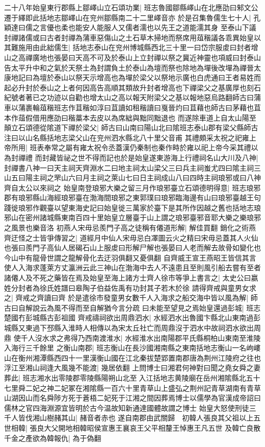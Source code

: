 二十八年始皇東行郡縣上鄒嶧山立石頌功業|{
	班志魯國鄒縣嶧山在北應劭曰邾文公遷于繹即此括地志鄒嶧山在兖州鄒縣南二十二里嶧音亦}
於是召集魯儒生七十人|{
	孔穎達曰儒之言優也柔也能安人能服人又儒者濡也以先王之道能濡其身}
至泰山下議封禪諸儒或曰古者封禪為蒲車惡傷山之土石草木掃地而祭席用葅稭議各乖異始皇以其難施用由此絀儒生|{
	括地志泰山在兖州博城縣西北三十里一曰岱宗服䖍曰封者增山之高禪廣地也張晏曰天高不可及於泰山上立封禪以祭之冀近神靈也項威曰封泰山告太平升中和之氣於天祭土為封謂負土於泰山為壇而祭也除地為墠後改墠為禪晉太康地記曰為壇於泰山以祭天示增高也為墠於梁父以祭地示廣也白虎通曰王者易姓而起必升封於泰山之上者何因高告高順其類故升封者增高也下禪梁父之基廣厚也刻石紀號者著已之功迹以自勸也增太山之高以報天附梁父之基以報地惡烏路翻師古曰蒲車以蒲裹輪葅稭班志作苴稭如淳曰苴讀如租稭讀曰戛晉灼曰苴藉也師古曰茅藉也苴本作葅假借用應劭曰稭藁本去皮以為席絀與黜同黜退也}
而遂除車道上自太山陽至顛立石頌德從隂道下禪於梁父|{
	師古曰山南曰陽山北曰隂班志泰山郡有梁父縣師古注曰以山名縣括地志梁父山在兖州泗水縣北八十里父音甫}
其禮頗采太祝之祀雍上帝所用|{
	班表奉常之屬有雍太祝令丞蓋漢仍秦制也秦作畤於雍以祀上帝今采其禮以為封禪禮}
而封藏皆祕之世不得而記也於是始皇遂東游海上行禮祠名山大川及八神|{
	封禪書八神一曰天主祠天齊淵水二曰地主祠太山梁父三曰兵主祠蚩尤四曰隂主祠三山五曰陽主祠之罘山六曰月主祠之萊山七曰日主祠成山八曰四時主祠琅邪或曰八神齊自太公以來祠之}
始皇南登琅邪大樂之留三月作琅邪臺立石頌德明得意|{
	班志琅邪郡有琅邪縣山海經琅邪臺在渤海間琅邪之東郭璞曰琅邪臨海邊有山曰琅邪臺越王句踐徙琅邪作觀臺以望東海史記曰始皇徙三萬家於臺下是其所作因越之舊也括地志琅邪山在密州諸城縣東南百四十里始皇立層臺于山上謂之琅邪臺邪音耶大樂之樂琅邪之風景也樂音洛}
初燕人宋毋忌羨門子高之徒稱有僊道形解|{
	解佳買翻}
銷化之術燕齊迂怪之士皆爭傳習之|{
	道經月中仙人宋毋忌白凙圖云火之精曰宋毋忌蓋其人火仙也張曰羨門子高仙人居碣石山上服䖍曰形解尸解也張晏曰人老而解去故骨如變化也今山中有龍骨世謂之龍解骨化去迂羽俱翻又憂俱翻}
自齊威王宣王燕昭王皆信其言使人入海求蓬萊方丈瀛洲云此三神山在渤海中去人不遠患且至則風引船去嘗有至者諸僊人及不死之藥皆在焉及始皇至海上諸方士齊人徐市等爭上書言之|{
	太史公曰嬴姓分封者為徐氏姓譜曰皋陶子伯益佐禹有功封其子若木於徐}
請得齊戒與童男女求之|{
	齊戒之齊讀曰齊}
於是遣徐市發童男女數千人入海求之船交海中皆以風為解|{
	師古曰自解說云為風不得而至自解猶今言分疏}
曰未能至望見之焉始皇還過彭城|{
	班志楚國冇彭城縣古彭祖國}
齊戒禱祠欲出周鼎泗水|{
	水經泗水出魯國卞縣北山東南過彭城縣又東過下邳縣入淮時人相傳以為宋太丘社亡而周鼎沒于泗水中故祠泗水欲出周鼎}
使千人沒水求之弗得乃西南渡淮水|{
	水經淮水出南陽郡平氏縣桐柏山東南至淮陵入海行三千餘里}
之衡山南郡|{
	班志衡山在長沙國湘南縣之東南括地志衡山一名岣嶁山在衡州湘潭縣西四十一里漢衡山國在江北秦拔楚郢置南郡唐為荆州江陵府之往也}
浮江至湘山祠逢大風幾不能渡|{
	幾居依翻}
上問博士曰湘君何神對曰聞之堯女舜之妻葬此|{
	班志湘水出零陵郡零陵縣陽朔山北至入江括地志黄陵廟在岳州湘隂縣北五十七里舜二妃之神二妃冢在湘隂縣一百六十里青草山上盛弘之荆州記青草湖南有青草山湖因山而名舜陟方死于蒼梧二妃死于江湘之間因葬焉博士以儒學為官漢成帝詔曰儒林之官四海淵源宜皆明於古今温故知新通達國體故謂之博士}
始皇大怒使刑徒三千人皆伐湘山樹赭其山|{
	赭音者赤也}
遂自南郡由武關歸　初韓人張良其父祖以上五世相韓|{
	張良大父開地相韓昭侯宣惠王襄哀王父平相釐王悼惠王凡五世}
及韓亡良散千金之產欲為韓報仇|{
	為于偽翻}


